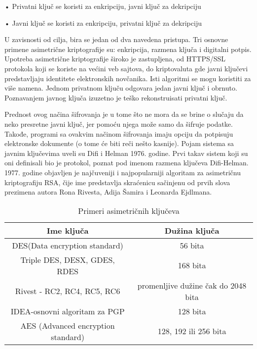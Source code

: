 \documentclass[a4paper]{article}
\begin{document}
• Privatni ključ se koristi za enkripciju, javni ključ za dekripciju

• Javni ključ se koristi za enkripciju, privatni ključ za dekripciju

U zavisnosti od cilja, bira se jedan od dva navedena pristupa. Tri osnovne primene asimetrične kriptografije su: enkripcija, razmena ključa i digitalni potpis.
Upotreba asimetrične kriptografije široko je zastupljena, od HTTPS/SSL protokola koji se koriste na većini veb sajtova, do kriptovaluta gde javni ključevi predstavljaju identitete
elektronskih novčanika. Isti algoritmi se mogu koristiti za više namena. Jednom privatnom ključu odgovara jedan javni ključ i obrnuto. Poznavanjem javnog ključa izuzetno je teško rekonstruisati privatni ključ. 

Prednost ovog načina šifrovanja je u tome što ne mora da se brine o slučaju da neko presretne javni ključ, jer pomoću njega može samo da šifruje podatke. Takođe, programi sa ovakvim načinom šifrovanja imaju opciju da potpisuju elektronske dokumente (o tome će biti reči nešto kasnije). Pojam sistema sa javnim ključevima uveli su Difi i Helman 1976. godine. Prvi takav sistem koji su oni definisali bio je protokol, poznat pod imenom razmena ključeva Difi-Helman. 1977. godine objavljen je najčuveniji i najpopularniji algoritam za asimetričnu kriptografiju RSA, čije ime predstavlja skraćenicu sačinjenu od prvih slova prezimena autora Rona Rivesta, Adija Šamira i Leonarda Ejdlmana.

\begin{table}[h!]
\begin{center}
\begin{tabular}{|c|c|} \hline
\textbf{Ime ključa} & \textbf{Dužina ključa} \\ \hline
DES(Data encryption standard)  & 56 bita \\ \hline
Triple DES, DESX, GDES, RDES & 168 bita \\ \hline
Rivest - RC2, RC4, RC5, RC6 & promenljive dužine čak do 2048 bita \\ \hline
IDEA-osnovni algoritam za PGP & 128 bita \\ \hline
AES (Advanced encryption standard) & 128, 192 ili 256 bita \\ \hline
\end{tabular}
\caption{Primeri asimetričnih ključeva}
\label{tab:tabela}
\end{center}
\end{table}
\end{document}
